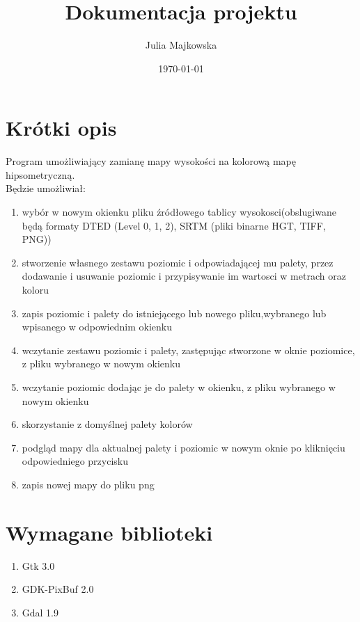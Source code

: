 \documentclass[a4paper]{article}
\author{Julia Majkowska}
\title{Dokumentacja projektu}
\date{\today}
\begin{document}
 \maketitle
 
 \section{Krótki opis}
 Program umożliwiający zamianę mapy wysokości na kolorową mapę hipsometryczną. \\
 Będzie umożliwiał:
 \begin{enumerate}

 
 \item{} wybór w nowym okienku pliku źródłowego tablicy wysokosci(obslugiwane będą formaty DTED (Level 0, 1, 2), SRTM (pliki binarne HGT, TIFF, PNG))
 
 \item{} stworzenie własnego zestawu poziomic i odpowiadającej mu palety, przez dodawanie i usuwanie poziomic i przypisywanie im wartosci w metrach oraz koloru 
 
 \item{} zapis poziomic i palety do istniejącego lub nowego pliku,wybranego lub wpisanego w odpowiednim okienku 
 
 \item{} wczytanie zestawu poziomic i palety, zastępując stworzone w oknie poziomice, z pliku wybranego w nowym okienku
 
 \item{} wczytanie poziomic dodając je do palety w okienku, z pliku wybranego w nowym okienku
 
 \item{} skorzystanie z domyślnej palety kolorów
 
 \item{} podgląd mapy dla aktualnej palety i poziomic w nowym oknie po kliknięciu odpowiedniego przycisku 
 
 \item{} zapis nowej mapy do pliku png

  
 \end{enumerate}
 \section{Wymagane biblioteki}
 \begin{enumerate}
\item{Gtk 3.0}
\item{GDK-PixBuf 2.0}
\item{Gdal 1.9}
 \end{enumerate}
 
\end{document}
